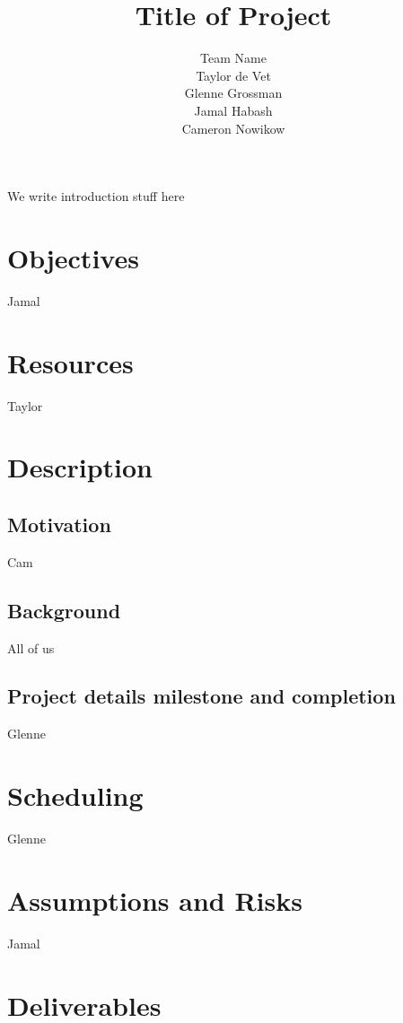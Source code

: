 \documentclass{article}
\title{Title of Project}
\author{Team Name
		\\ Taylor de Vet
    \\ Glenne Grossman
		\\ Jamal Habash
		\\ Cameron Nowikow
}
\date{}
\begin{document}
\newpage

\maketitle

We write introduction stuff here

\section{Objectives}
Jamal

\section{Resources}
Taylor


\section{Description}

\subsection{Motivation}
Cam
\subsection{Background}
All of us
\subsection{Project details milestone and completion}
Glenne
\section{Scheduling}
Glenne
\section{Assumptions and Risks}
Jamal
\section{Deliverables}
\end{document}
